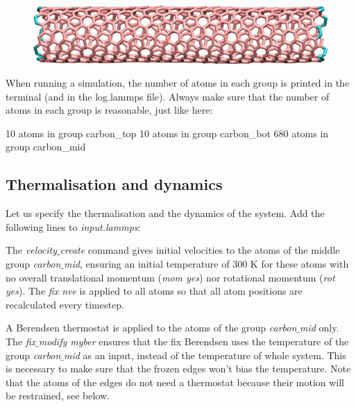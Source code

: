 \begin{figure}
\includegraphics[width=\linewidth]{tutorials/level1/breaking-a-carbon-nanotube/light_colored_edges.png}
\end{figure}

When running a simulation, the number of atoms in each
group is printed in the terminal (and in the log.lammps
file). Always make sure that the number of atoms in each group 
is reasonable, just like here:

\begin{lcverbatim}
10 atoms in group carbon_top
10 atoms in group carbon_bot
680 atoms in group carbon_mid
\end{lcverbatim}

\noindent \subsection{Thermalisation and dynamics}

Let us specify the thermalisation and the dynamics of the
system. Add the following lines to \textit{input.lammps}:


\noindent The \textit{velocity$\_$create} command gives initial velocities to
the atoms of the middle group \textit{carbon$\_$mid}, ensuring an initial temperature
of 300 K for these atoms with no overall translational momentum (\textit{mom yes})
nor rotational momentum (\textit{rot yes}).
The \textit{fix nve} is applied to all atoms so that all atom positions are recalculated
every timestep. 

A Berendsen thermostat is applied to the atoms
of the group \textit{carbon$\_$mid} only. The \textit{fix$\_$modify myber} ensures that the
fix Berendsen uses the temperature of the group \textit{carbon$\_$mid} as an
input, instead of the temperature of whole system. This is necessary
to make sure that the frozen edges won't bias the temperature. Note that the atoms
of the edges do not need a thermostat because their motion will
be restrained, see below.

